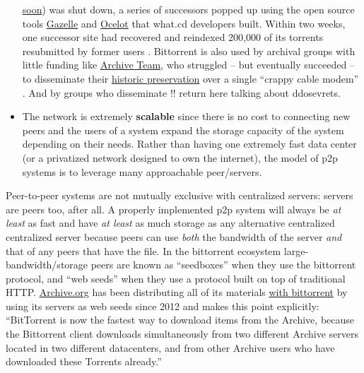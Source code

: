 \documentclass[notoc]{tufte-book}
\begin{document}
\begin{itemize}
  \protect\hyperlink{archives-need-communities}{soon}) was shut down, a
  series of successors popped up using the open source tools
  \href{https://github.com/WhatCD/Gazelle}{Gazelle} and
  \href{https://github.com/WhatCD/Ocelot}{Ocelot} that what.cd
  developers built. Within two weeks, one successor site had recovered
  and reindexed 200,000 of its torrents resubmitted by former users \citep{vandersarWhatCdDead2016} . Bittorrent is also used by archival
  groups with little funding like
  \href{https://wiki.archiveteam.org/index.php/Main_Page}{Archive Team},
  who struggled -- but eventually succeeded -- to disseminate their
  \href{https://wiki.archiveteam.org/index.php/GeoCities_Project}{historic
  preservation} over a single ``crappy cable modem'' \citep{scottGeocitiesTorrentUpdate2010} . And by groups who disseminate !!
  return here talking about ddosevrets.
\item
  The network is extremely \textbf{scalable} since there is no cost to
  connecting new peers and the users of a system expand the storage
  capacity of the system depending on their needs. Rather than having
  one extremely fast data center (or a privatized network designed to
  own the internet), the model of p2p systems is to leverage many
  approachable peer/servers.
\end{itemize}

Peer-to-peer systems are not mutually exclusive with centralized
servers: servers are peers too, after all. A properly implemented p2p
system will always be \emph{at least} as fast and have \emph{at least}
as much storage as any alternative centralized centralized server
because peers can use \emph{both} the bandwidth of the server \emph{and}
that of any peers that have the file. In the bittorrent ecosystem
large-bandwidth/storage peers are known as ``seedboxes''\citep{rossiPeekingBitTorrentSeedbox2014}  when they use the bittorrent
protocol, and ``web seeds''\citep{hoffmanHTTPBasedSeedingSpecification}  when they use a protocol built
on top of traditional HTTP. \href{https://archive.org}{Archive.org} has
been distributing all of its materials
\href{https://archive.org/details/bittorrent}{with bittorrent} by using
its servers as web seeds since 2012 and makes this point explicitly:
``BitTorrent is now the fastest way to download items from the Archive,
because the Bittorrent client downloads simultaneously from two
different Archive servers located in two different datacenters, and from
other Archive users who have downloaded these Torrents already.'' \citep{kahle000000Torrents2012} 
\end{document}
